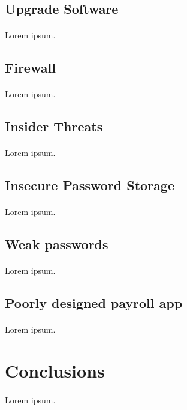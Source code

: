 \documentclass{article}
\begin{document}
\subsection{Upgrade Software}
\paragraph{}
Lorem ipsum.

\subsection{Firewall}
\paragraph{}
Lorem ipsum.

\subsection{Insider Threats}
\paragraph{}
Lorem ipsum.

\subsection{Insecure Password Storage}
\paragraph{}
Lorem ipsum.

\subsection{Weak passwords}
\paragraph{}
Lorem ipsum.

\subsection{Poorly designed payroll app}
\paragraph{}
Lorem ipsum.

\newpage

\section{Conclusions}
\paragraph{}
Lorem ipsum.
\end{document}
